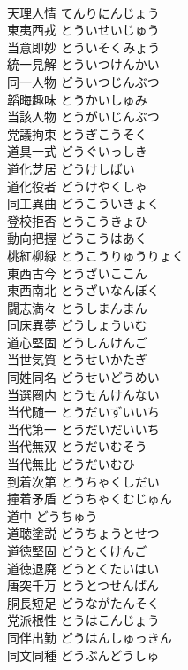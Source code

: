 \documentclass[8pt]{extreport}
\begin{document}
\begin{CJK}{UTF8}{min}
\\	天理人情	てんりにんじょう	
\\	東夷西戎	とういせいじゅう	
\\	当意即妙	とういそくみょう	
\\	統一見解	とういつけんかい	
\\	同一人物	どういつじんぶつ	
\\	韜晦趣味	とうかいしゅみ	
\\	当該人物	とうがいじんぶつ	
\\	党議拘束	とうぎこうそく	
\\	道具一式	どうぐいっしき	
\\	道化芝居	どうけしばい	
\\	道化役者	どうけやくしゃ	
\\	同工異曲	どうこういきょく	
\\	登校拒否	とうこうきょひ	
\\	動向把握	どうこうはあく	
\\	桃紅柳緑	とうこうりゅうりょく	
\\	東西古今	とうざいここん	
\\	東西南北	とうざいなんぼく	
\\	闘志満々	とうしまんまん	
\\	同床異夢	どうしょういむ	
\\	道心堅固	どうしんけんご	
\\	当世気質	とうせいかたぎ	
\\	同姓同名	どうせいどうめい	
\\	当選圏内	とうせんけんない	
\\	当代随一	とうだいずいいち	
\\	当代第一	とうだいだいいち	
\\	当代無双	とうだいむそう	
\\	当代無比	どうだいむひ	
\\	到着次第	とうちゃくしだい	
\\	撞着矛盾	どうちゃくむじゅん	
\\	道中	どうちゅう	
\\	道聴塗説	どうちょうとせつ	
\\	道徳堅固	どうとくけんご	
\\	道徳退廃	どうとくたいはい	
\\	唐突千万	とうとつせんばん	
\\	胴長短足	どうながたんそく	
\\	党派根性	とうはこんじょう	
\\	同伴出勤	どうはんしゅっきん	
\\	同文同種	どうぶんどうしゅ	

\end{CJK}
\end{document}
